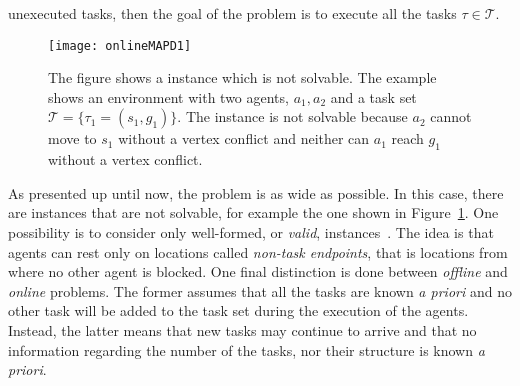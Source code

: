 unexecuted tasks, then the goal of the problem is to execute all the tasks 
$\tau\in\mathcal{T}$.
\begin{figure}[tpb]
  \centering
  \texttt{[image: onlineMAPD1]}
  \caption{The figure shows a  instance which is not solvable. The
  example shows an environment with two agents, $a_1, a_2$ and a task set
  $\mathcal{T}=\{\tau_1=(s_1,g_1)\}$. The instance is not solvable because 
  $a_2$ cannot move to $s_1$ without a vertex conflict and neither can $a_1$ 
  reach $g_1$ without a vertex conflict. }
  \label{fig:onlineMAPD1}
\end{figure}
\newline
As presented up until now, the problem is as wide as possible. In this case,
there are instances that are not solvable, for example the one shown in
Figure~\ref{fig:onlineMAPD1}. One possibility is to consider only well-formed,
or \textit{valid},  instances~\cite{wellFormedMAPD}. The idea is 
that agents can rest only on locations called \textit{non-task endpoints}, that 
is locations from where no other agent is blocked. \newline
One final distinction is done between \textit{offline} and \textit{online}
 problems. The former assumes that all the tasks are known \textit{a 
priori} and no other task will be added to the task set during the execution of
the agents. Instead, the latter means that new tasks may continue to arrive and
that no information regarding the number of the tasks, nor their structure is
known \textit{a priori}. 
%

